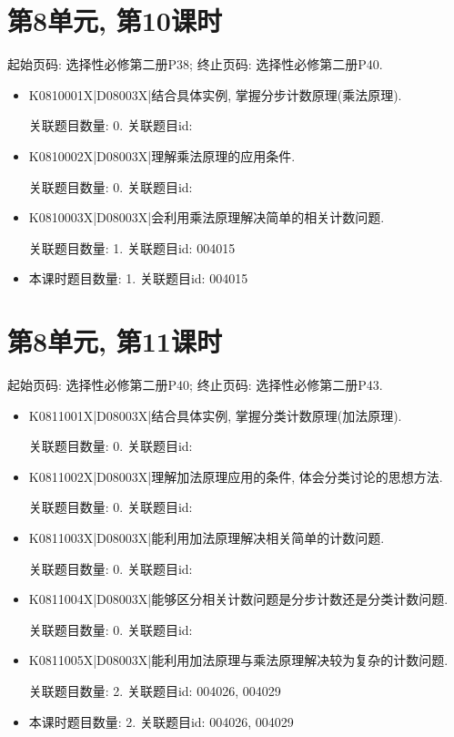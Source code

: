\section*{第8单元, 第10课时}
起始页码: 选择性必修第二册P38; 终止页码: 选择性必修第二册P40.
\begin{itemize}
\item K0810001X|D08003X|结合具体实例, 掌握分步计数原理(乘法原理).

关联题目数量: 0. 关联题目id: 

\item K0810002X|D08003X|理解乘法原理的应用条件.

关联题目数量: 0. 关联题目id: 

\item K0810003X|D08003X|会利用乘法原理解决简单的相关计数问题.

关联题目数量: 1. 关联题目id: 004015

\item 本课时题目数量: 1. 关联题目id: 004015

\end{itemize}

\section*{第8单元, 第11课时}
起始页码: 选择性必修第二册P40; 终止页码: 选择性必修第二册P43.
\begin{itemize}
\item K0811001X|D08003X|结合具体实例, 掌握分类计数原理(加法原理).

关联题目数量: 0. 关联题目id: 

\item K0811002X|D08003X|理解加法原理应用的条件, 体会分类讨论的思想方法.

关联题目数量: 0. 关联题目id: 

\item K0811003X|D08003X|能利用加法原理解决相关简单的计数问题.

关联题目数量: 0. 关联题目id: 

\item K0811004X|D08003X|能够区分相关计数问题是分步计数还是分类计数问题.

关联题目数量: 0. 关联题目id: 

\item K0811005X|D08003X|能利用加法原理与乘法原理解决较为复杂的计数问题.

关联题目数量: 2. 关联题目id: 004026, 004029

\item 本课时题目数量: 2. 关联题目id: 004026, 004029

\end{itemize}

